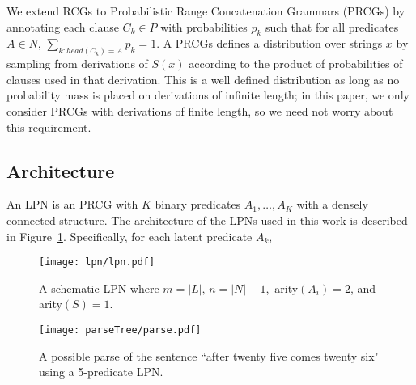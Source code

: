 \documentclass[11pt, twocolumn]{article}
\begin{document}
We extend RCGs to Probabilistic Range Concatenation Grammars (PRCGs)
by annotating each clause $C_k \in P$ with probabilities $p_k$ such
that for all predicates ${A \in N, \, \sum_{k:head(C_k)=A} p_k = 1}$. A
PRCGs defines a distribution over strings $x$ by sampling from
derivations of $S(x)$ according to the product of probabilities of
clauses used in that derivation. This is a well defined distribution
as long as no probability mass is placed on derivations of infinite
length; in this paper, we only consider PRCGs with derivations of
finite length, so we need not worry about this requirement.

\subsection{Architecture}

An LPN is an PRCG with $K$ binary predicates $A_1, \dots, A_K$ with a
densely connected structure. The architecture of the LPNs used in this
work is described in Figure~\ref{fig:architecture}. Specifically, for
each latent predicate $A_k$, 
 
\begin{figure}[t]
		\texttt{[image: lpn/lpn.pdf]}
		\caption{A schematic LPN where $m = |L|,\, n = |N|-1$,\, arity$(A_i) = 2$, and arity$(S) = 1$.}
		\label{fig:architecture}
\end{figure}

\begin{figure}[t]
		\texttt{[image: parseTree/parse.pdf]}
		\caption{A possible parse of the sentence ``after twenty five comes twenty six" using a 5-predicate LPN.}
\end{figure}



\end{document}
